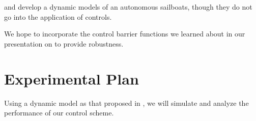 \documentclass[conference]{IEEEtran}
\begin{document}
\cite{Setiawan2020} and \cite{Buehler2018} develop a dynamic models of an autonomous sailboats, though they do not go into the application of controls.

We hope to incorporate the control barrier functions we learned about in our presentation on \cite{Ames2019} to provide robustness.


\section{Experimental Plan}
Using a dynamic model as that proposed in \cite{Buehler2018}, we will simulate and analyze the performance of our control scheme.



\end{document}
